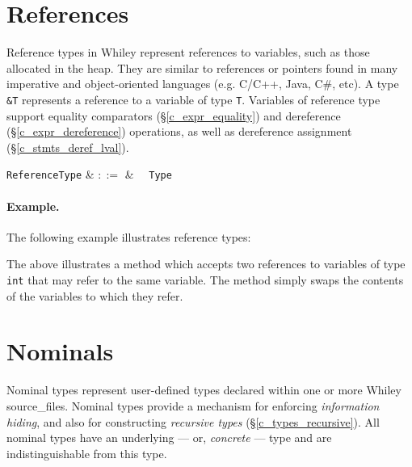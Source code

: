 
\section{References}

Reference types in Whiley represent references to variables, such as those allocated in the heap.  They are similar to references or pointers found in many imperative and object-oriented languages (e.g. C/C++, Java, C\#, etc).  A type \lstinline{&T} represents a reference to a variable of type \lstinline{T}.  Variables of reference type support equality comparators (\S\ref{c_expr_equality}) and dereference (\S\ref{c_expr_dereference}) operations, as well as dereference assignment (\S\ref{c_stmts_deref_lval}).

\begin{syntax}
  \verb+ReferenceType+ & $::=$ & \token{\&}\ \ \verb+Type+\\
\end{syntax}

\paragraph{Example.} The following example illustrates reference types:



The above illustrates a method which accepts two references to variables of type \lstinline{int} that may refer to the same variable.  The method simply swaps the contents of the variables to which they refer.


\section{Nominals}
\label{c_types_nominal}

Nominal types represent user-defined types declared within one or more Whiley \gls{source_file}s.  Nominal types provide a mechanism for enforcing {\em information hiding}, and also for constructing {\em recursive types} (\S\ref{c_types_recursive}).  All nominal types have an underlying --- or, {\em concrete} --- type and are indistinguishable from this type.   

